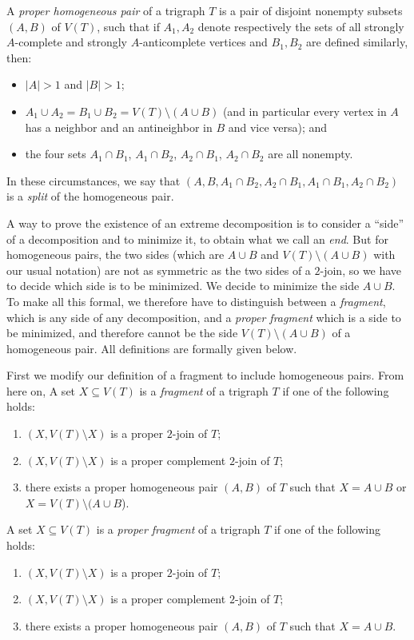 \documentclass[11 pt] {article}
\begin{document}
A {\em proper homogeneous pair} of a trigraph $T$ is a pair of
disjoint nonempty subsets $(A,B)$ of $V(T)$, such that if $A_1,A_2$
denote respectively the sets of all strongly $A$-complete and strongly
$A$-anticomplete vertices and $B_1,B_2$ are defined similarly, then:
\begin{itemize}
\item $|A|>1$ and $|B|>1$;
\item $A_1 \cup A_2=B_1 \cup B_2 = V(T) \setminus (A \cup B)$
(and in particular every vertex in $A$ has a neighbor and an 
antineighbor in $B$ and vice versa); and 
\item the four sets $A_1 \cap B_1$, $A_1 \cap B_2$, $A_2 \cap B_1$, 
$A_2 \cap B_2$ are all nonempty.
\end{itemize}

In these circumstances, we say that $(A, B, A_1 \cap B_2, A_2 \cap B_1,
A_1 \cap B_1, A_2 \cap B_2)$ is a \emph{split} of the homogeneous
pair.

A way to prove the existence of an extreme decomposition is to
consider a ``side'' of a decomposition and to minimize it, to obtain
what we call an \emph{end}.  But for homogeneous pairs, the two sides
(which are $A \cup B$ and $V(T) \setminus (A \cup B)$ with our usual
notation) are not as symmetric as the two sides of a $2$-join, so we
have to decide which side is to be minimized.  We decide to minimize
the side $A \cup B$.  To make all this formal, we therefore have to
distinguish between a \emph{fragment}, which is any side of any
decomposition, and a \emph{proper fragment} which is a side to be
minimized, and therefore cannot be the side $V(T) \setminus (A \cup
B)$ of a homogeneous pair.  All definitions are formally given below.

First we modify our definition of a fragment to include
homogeneous pairs. From here on, A set $X\subseteq V(T)$ is a
\emph{fragment} of a trigraph $T$ if one of the following holds:

\begin{enumerate}
\item\label{i:2J} $(X,V(T)\setminus X)$ is a proper $2$-join of $T$;
\item\label{i:C2J} $(X,V(T)\setminus X)$ is a proper complement $2$-join of $T$;
\item there exists a proper homogeneous pair $(A,B)$ of $T$ such that
$X = A\cup B$ or $X = V(T)\setminus (A\cup B$). 
\end{enumerate}

A set $X\subseteq V(T)$ is a \emph{proper fragment} of a trigraph $T$ if
one of the following holds:
\begin{enumerate}
\item\label{i:2J} $(X,V(T)\setminus X)$ is a proper $2$-join of $T$;
\item\label{i:C2J} $(X,V(T)\setminus X)$ is a proper complement $2$-join of $T$;
\item\label{i:HP} there exists a proper homogeneous pair $(A,B)$ of $T$ such that
$X = A\cup B$.
\end{enumerate}
\end{document}
